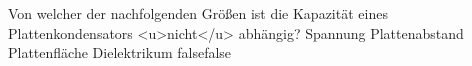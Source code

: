     {Von welcher der nachfolgenden Größen ist die Kapazität eines Plattenkondensators <u>nicht</u> abhängig?}
    {Spannung}
    {Plattenabstand}
    {Plattenfläche}
    {Dielektrikum}
    {false}{false}